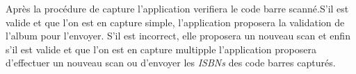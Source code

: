 Après la procédure de capture l'application verifiera le code barre scanné.S'il est valide et que l'on est en capture simple, l'application proposera la validation de l'album pour l'envoyer.
S'il est incorrect, elle proposera un nouveau scan et enfin s'il est valide et que l'on est en capture multipple l'application proposera d'effectuer un nouveau scan ou d'envoyer les \emph{ISBNs} des code barres capturés.

\begin{figure}[htbp]
  \begin{center}
    \leavevmode
    \hspace{1cm}
    \hspace{1cm}
  \end{center}
\end{figure}

